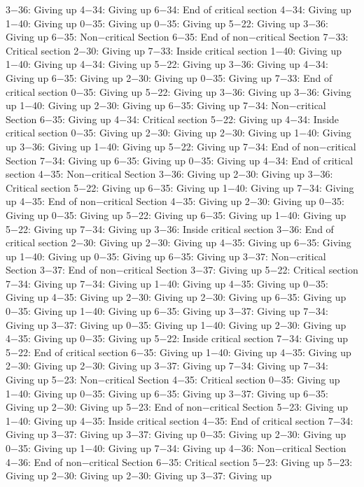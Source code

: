 3−36: Giving up
4−34: Giving up
6−34: End of critical section
4−34: Giving up
1−40: Giving up
0−35: Giving up
0−35: Giving up
5−22: Giving up
3−36: Giving up
6−35: Non−critical Section
6−35: End of non−critical Section
7−33: Critical section
2−30: Giving up
7−33: Inside critical section
1−40: Giving up
1−40: Giving up
4−34: Giving up
5−22: Giving up
3−36: Giving up
4−34: Giving up
6−35: Giving up
2−30: Giving up
0−35: Giving up
7−33: End of critical section
0−35: Giving up
5−22: Giving up
3−36: Giving up
3−36: Giving up
1−40: Giving up
2−30: Giving up
6−35: Giving up
7−34: Non−critical Section
6−35: Giving up
4−34: Critical section
5−22: Giving up
4−34: Inside critical section
0−35: Giving up
2−30: Giving up
2−30: Giving up
1−40: Giving up
3−36: Giving up
1−40: Giving up
5−22: Giving up
7−34: End of non−critical Section
7−34: Giving up
6−35: Giving up
0−35: Giving up
4−34: End of critical section
4−35: Non−critical Section
3−36: Giving up
2−30: Giving up
3−36: Critical section
5−22: Giving up
6−35: Giving up
1−40: Giving up
7−34: Giving up
4−35: End of non−critical Section
4−35: Giving up
2−30: Giving up
0−35: Giving up
0−35: Giving up
5−22: Giving up
6−35: Giving up
1−40: Giving up
5−22: Giving up
7−34: Giving up
3−36: Inside critical section
3−36: End of critical section
2−30: Giving up
2−30: Giving up
4−35: Giving up
6−35: Giving up
1−40: Giving up
0−35: Giving up
6−35: Giving up
3−37: Non−critical Section
3−37: End of non−critical Section
3−37: Giving up
5−22: Critical section
7−34: Giving up
7−34: Giving up
1−40: Giving up
4−35: Giving up
0−35: Giving up
4−35: Giving up
2−30: Giving up
2−30: Giving up
6−35: Giving up
0−35: Giving up
1−40: Giving up
6−35: Giving up
3−37: Giving up
7−34: Giving up
3−37: Giving up
0−35: Giving up
1−40: Giving up
2−30: Giving up
4−35: Giving up
0−35: Giving up
5−22: Inside critical section
7−34: Giving up
5−22: End of critical section
6−35: Giving up
1−40: Giving up
4−35: Giving up
2−30: Giving up
2−30: Giving up
3−37: Giving up
7−34: Giving up
7−34: Giving up
5−23: Non−critical Section
4−35: Critical section
0−35: Giving up
1−40: Giving up
0−35: Giving up
6−35: Giving up
3−37: Giving up
6−35: Giving up
2−30: Giving up
5−23: End of non−critical Section
5−23: Giving up
1−40: Giving up
4−35: Inside critical section
4−35: End of critical section
7−34: Giving up
3−37: Giving up
3−37: Giving up
0−35: Giving up
2−30: Giving up
0−35: Giving up
1−40: Giving up
7−34: Giving up
4−36: Non−critical Section
4−36: End of non−critical Section
6−35: Critical section
5−23: Giving up
5−23: Giving up
2−30: Giving up
2−30: Giving up
3−37: Giving up
